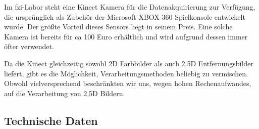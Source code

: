 Im \gls{fzi}-Labor steht eine Kinect Kamera für die Datenakquirierung zur
 Verfügung, die ursprünglich als Zubehör der Microsoft XBOX 360 Spielkonsole
 entwickelt wurde. Der größte Vorteil dieses Sensors liegt in seinem Preis. Eine
 solche Kamera ist bereits für ca 100 Euro erhältlich und wird aufgrund dessen
 immer öfter verwendet.
 
Da die Kinect gleichzeitig sowohl 2D Farbbilder als auch 2.5D Entfernungsbilder liefert, gibt es die Möglichkeit, Verarbeitungsmethoden beliebig zu vermischen.
 Obwohl vielversprechend beschränkten wir uns, wegen hohen Rechenaufwandes, auf
 die Verarbeitung von 2.5D Bildern.
\vspace{0.3cm}

\subsection{Technische Daten}
\label{kinect_umsetzung_technische_daten}
\authorsection{\editorhamza}
%
%
%
%
%
%
%
